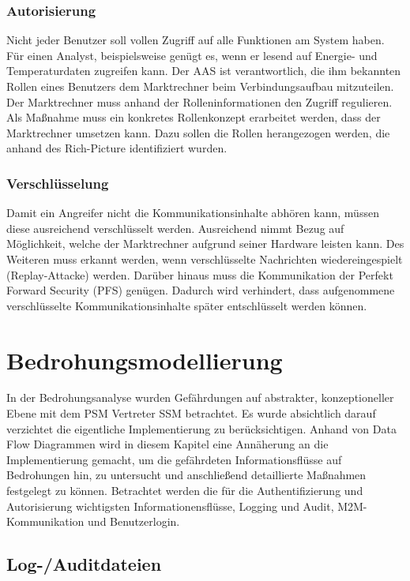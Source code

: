 \documentclass[11pt,a4paper]{report}
\begin{document}
\subsection{Autorisierung}
Nicht jeder Benutzer soll vollen Zugriff auf alle Funktionen am System haben. Für einen Analyst, beispielsweise genügt es, wenn er lesend auf Energie- und Temperaturdaten zugreifen kann. Der AAS ist verantwortlich, die ihm bekannten Rollen eines Benutzers dem Marktrechner beim Verbindungsaufbau mitzuteilen. Der Marktrechner muss anhand der Rolleninformationen den Zugriff regulieren. Als Maßnahme muss ein konkretes Rollenkonzept erarbeitet werden, dass der Marktrechner umsetzen kann. Dazu sollen die Rollen herangezogen werden, die anhand des Rich-Picture identifiziert wurden.

\subsection{Verschlüsselung}
Damit ein Angreifer nicht die Kommunikationsinhalte abhören kann, müssen diese ausreichend verschlüsselt werden. Ausreichend nimmt Bezug auf Möglichkeit, welche der Marktrechner aufgrund seiner Hardware leisten kann. Des Weiteren muss erkannt werden, wenn verschlüsselte Nachrichten wiedereingespielt (Replay-Attacke) werden. Darüber hinaus muss die Kommunikation der Perfekt Forward Security (PFS) genügen. Dadurch wird verhindert, dass aufgenommene verschlüsselte Kommunikationsinhalte später entschlüsselt werden können.

\chapter{Bedrohungsmodellierung} \label{chap:threat_modelling}

In der Bedrohungsanalyse wurden Gefährdungen auf abstrakter, konzeptioneller Ebene mit dem PSM Vertreter SSM betrachtet. Es wurde absichtlich darauf verzichtet die eigentliche Implementierung zu berücksichtigen. Anhand von Data Flow Diagrammen wird in diesem Kapitel eine Annäherung an die Implementierung gemacht, um die gefährdeten Informationsflüsse auf Bedrohungen hin, zu untersucht und anschließend detaillierte Maßnahmen festgelegt zu können. Betrachtet werden die für die Authentifizierung und Autorisierung wichtigsten Informationensflüsse, Logging und Audit, M2M-Kommunikation und Benutzerlogin.

\section{Log-/Auditdateien} \label{sec:bmod_logaud} 
\end{document}
